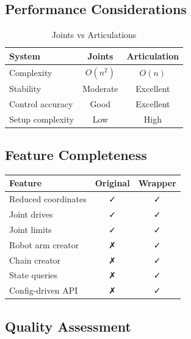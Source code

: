 
\subsection{Performance Considerations}

\begin{table}[h]
\centering
\begin{tabular}{|l|c|c|}
\hline
\textbf{System} & \textbf{Joints} & \textbf{Articulation} \\
\hline
Complexity & $O(n^2)$ & $O(n)$ \\
Stability & Moderate & Excellent \\
Control accuracy & Good & Excellent \\
Setup complexity & Low & High \\
\hline
\end{tabular}
\caption{Joints vs Articulations}
\end{table}


\subsection{Feature Completeness}

\begin{table}[h]
\centering
\begin{tabular}{|l|c|c|}
\hline
\textbf{Feature} & \textbf{Original} & \textbf{Wrapper} \\
\hline
Reduced coordinates & ✓ & ✓ \\
Joint drives & ✓ & ✓ \\
Joint limits & ✓ & ✓ \\
Robot arm creator & ✗ & ✓ \\
Chain creator & ✗ & ✓ \\
State queries & ✗ & ✓ \\
Config-driven API & ✗ & ✓ \\
\hline
\end{tabular}
\end{table}


\subsection{Quality Assessment}

